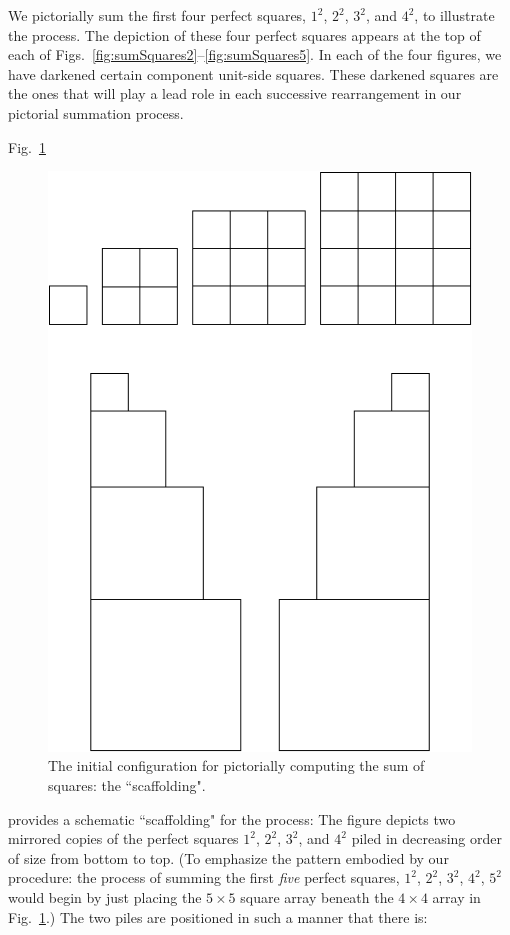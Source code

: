 \smallskip

We pictorially sum the first four perfect squares, $1^2$, $2^2$, $3^2$, and $4^2$, to illustrate the process.  The depiction of these four perfect squares appears at the top of each of Figs.~\ref{fig:sumSquares2}--\ref{fig:sumSquares5}.  In each of the four figures, we have darkened certain component unit-side squares.  These darkened squares are the ones that will play a lead role in each successive rearrangement in our pictorial summation process.

\medskip

Fig.~\ref{fig:sumSquares1} 
\begin{figure}[htb]
\begin{center}
       \includegraphics[scale=0.3]{FiguresMaths/SumSquares1}
\caption{The initial configuration for pictorially computing the sum of squares: the ``scaffolding".}
       \label{fig:sumSquares1}
\end{center}
\end{figure}
provides a schematic ``scaffolding" for the process:  The figure depicts two mirrored copies of the perfect squares $1^2$, $2^2$, $3^2$, and $4^2$ piled in decreasing order of size from bottom to top.  (To emphasize the pattern embodied by our procedure: the process of summing the first {\em five} perfect squares, $1^2$, $2^2$, $3^2$, $4^2$, $5^2$ would begin by just placing the $5 \times 5$ square array beneath the $4 \times 4$ array in Fig.~\ref{fig:sumSquares1}.)  The two piles are positioned in such a manner that there is:
